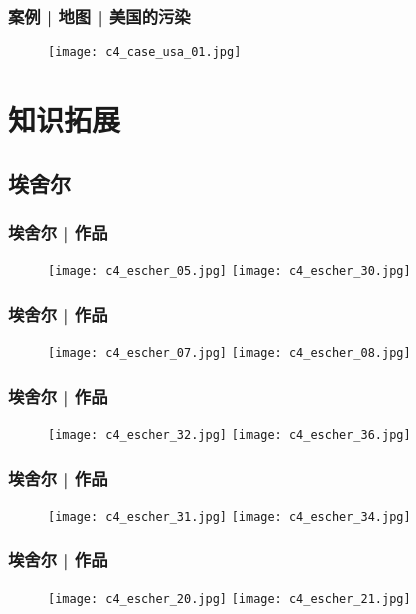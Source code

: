 \begin{frame}
  \frametitle{案例 | 地图 | 美国的污染}
    \begin{figure}
      \centering
      \texttt{[image: c4\_case\_usa\_01.jpg]}
    \end{figure}
\end{frame}

\section{知识拓展}
\subsection{埃舍尔}
\begin{frame}
  \frametitle{埃舍尔 | 作品}
  \begin{figure}
    \centering
    \texttt{[image: c4\_escher\_05.jpg]}\quad
    \texttt{[image: c4\_escher\_30.jpg]}
  \end{figure}
\end{frame}

\begin{frame}
  \frametitle{埃舍尔 | 作品}
  \begin{figure}
    \centering
    \texttt{[image: c4\_escher\_07.jpg]}\quad
    \texttt{[image: c4\_escher\_08.jpg]}
  \end{figure}
\end{frame}

\begin{frame}
  \frametitle{埃舍尔 | 作品}
  \begin{figure}
    \centering
    \texttt{[image: c4\_escher\_32.jpg]}\quad
    \texttt{[image: c4\_escher\_36.jpg]}
  \end{figure}
\end{frame}

\begin{frame}
  \frametitle{埃舍尔 | 作品}
  \begin{figure}
    \centering
    \texttt{[image: c4\_escher\_31.jpg]}\quad
    \texttt{[image: c4\_escher\_34.jpg]}
  \end{figure}
\end{frame}

\begin{frame}
  \frametitle{埃舍尔 | 作品}
  \begin{figure}
    \centering
    \texttt{[image: c4\_escher\_20.jpg]}\quad
    \texttt{[image: c4\_escher\_21.jpg]}
  \end{figure}
\end{frame}

